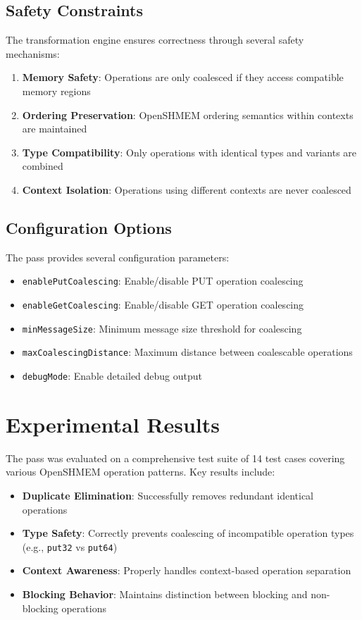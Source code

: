\documentclass{article}
\begin{document}
\subsection{Safety Constraints}
The transformation engine ensures correctness through several safety mechanisms:
\begin{enumerate}
\item \textbf{Memory Safety}: Operations are only coalesced if they access compatible memory regions
\item \textbf{Ordering Preservation}: OpenSHMEM ordering semantics within contexts are maintained
\item \textbf{Type Compatibility}: Only operations with identical types and variants are combined
\item \textbf{Context Isolation}: Operations using different contexts are never coalesced
\end{enumerate}

\subsection{Configuration Options}
The pass provides several configuration parameters:
\begin{itemize}
\item \texttt{enablePutCoalescing}: Enable/disable PUT operation coalescing
\item \texttt{enableGetCoalescing}: Enable/disable GET operation coalescing  
\item \texttt{minMessageSize}: Minimum message size threshold for coalescing
\item \texttt{maxCoalescingDistance}: Maximum distance between coalescable operations
\item \texttt{debugMode}: Enable detailed debug output
\end{itemize}

\section{Experimental Results}

The pass was evaluated on a comprehensive test suite of 14 test cases covering various OpenSHMEM operation patterns. Key results include:

\begin{itemize}
\item \textbf{Duplicate Elimination}: Successfully removes redundant identical operations
\item \textbf{Type Safety}: Correctly prevents coalescing of incompatible operation types (e.g., \texttt{put32} vs \texttt{put64})
\item \textbf{Context Awareness}: Properly handles context-based operation separation
\item \textbf{Blocking Behavior}: Maintains distinction between blocking and non-blocking operations
\end{itemize}
\end{document}
